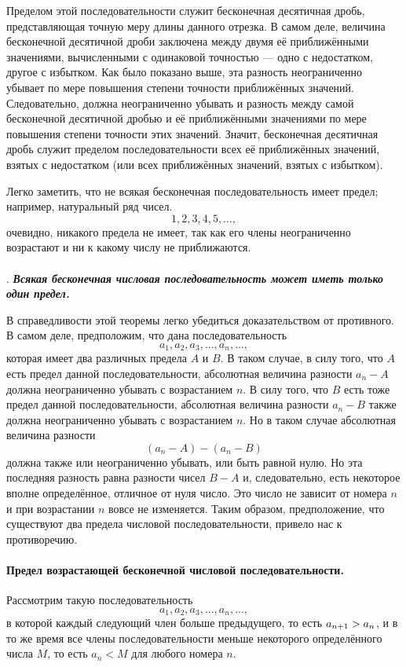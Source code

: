 Пределом этой последовательности служит бесконечная десятичная дробь, представляющая точную меру длины данного отрезка.
В самом деле, величина бесконечной десятичной дроби заключена между двумя её приближёнными значениями, вычисленными с одинаковой точностью — одно с недостатком, другое с избытком. 
Как было показано выше, эта разность неограниченно убывает по мере повышения степени точности приближённых значений.
Следовательно, должна неограниченно убывать и разность между самой бесконечной десятичной дробью и её приближёнными значениями по мере повышения степени точности этих значений.
Значит, бесконечная десятичная дробь служит пределом последовательности всех её приближённых значений, взятых с недостатком (или всех приближённых значений, взятых с избытком).

Легко заметить, что не всякая бесконечная последовательность имеет предел;
например, натуральный ряд чисел.
\[1, 2, 3, 4, 5,\dots,\]
очевидно, никакого предела не имеет, так как его члены неограниченно возрастают и ни к какому числу не приближаются.

\paragraph{}\label{1938/228}
.
\textbf{\emph{Всякая бесконечная числовая последовательность может иметь только один предел.}}

В справедливости этой теоремы легко убедиться доказательством от противного.
В самом деле, предположим, что дана последовательность
\[a_1,a_2,a_3,\dots,a_n,\dots,\]
которая имеет два различных предела $A$ и $B$.
В таком случае, в силу того, что $A$ есть предел данной последовательности, абсолютная величина разности $a_n-A$ должна неограниченно убывать с возрастанием $n$.
В силу того, что $B$ есть тоже предел данной последовательности, абсолютная величина разности $a_n-B$ также должна неограниченно убывать с возрастанием $n$.
Но в таком случае абсолютная величина разности
\[(a_n-A)-(a_n-B)\]
должна также или неограниченно убывать, или быть равной нулю.
Но эта последняя разность равна разности чисел $B-A$ и, следовательно, есть некоторое вполне определённое, отличное от нуля число.
Это число не зависит от номера $n$ и при возрастании $n$ вовсе не изменяется.
Таким образом, предположение, что существуют два предела числовой последовательности, привело нас к противоречию.

{\sloppy 
\paragraph{Предел возрастающей бесконечной числовой последовательности.}\label{1938/229}
Рассмотрим такую последовательность 
\[a_1, a_2, a_3,\dots,a_n,\dots,\]
в которой каждый следующий член больше предыдущего, то есть $a_{n+1} \z> a_n$, и в то же время все члены последовательности меньше некоторого определённого числа $M$, то есть $a_n < M$ для любого номера $n$.

}

